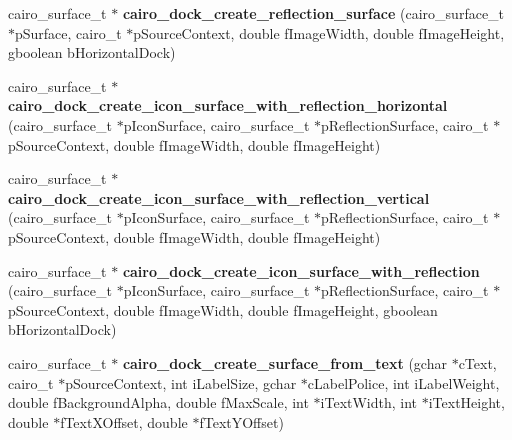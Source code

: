 \begin{CompactItemize}
\item 
cairo\_\-surface\_\-t $\ast$ {\bf cairo\_\-dock\_\-create\_\-reflection\_\-surface} (cairo\_\-surface\_\-t $\ast$p\-Surface, cairo\_\-t $\ast$p\-Source\-Context, double f\-Image\-Width, double f\-Image\-Height, gboolean b\-Horizontal\-Dock)
\item 
cairo\_\-surface\_\-t $\ast$ {\bf cairo\_\-dock\_\-create\_\-icon\_\-surface\_\-with\_\-reflection\_\-horizontal} (cairo\_\-surface\_\-t $\ast$p\-Icon\-Surface, cairo\_\-surface\_\-t $\ast$p\-Reflection\-Surface, cairo\_\-t $\ast$p\-Source\-Context, double f\-Image\-Width, double f\-Image\-Height)
\item 
cairo\_\-surface\_\-t $\ast$ {\bf cairo\_\-dock\_\-create\_\-icon\_\-surface\_\-with\_\-reflection\_\-vertical} (cairo\_\-surface\_\-t $\ast$p\-Icon\-Surface, cairo\_\-surface\_\-t $\ast$p\-Reflection\-Surface, cairo\_\-t $\ast$p\-Source\-Context, double f\-Image\-Width, double f\-Image\-Height)
\item 
cairo\_\-surface\_\-t $\ast$ {\bf cairo\_\-dock\_\-create\_\-icon\_\-surface\_\-with\_\-reflection} (cairo\_\-surface\_\-t $\ast$p\-Icon\-Surface, cairo\_\-surface\_\-t $\ast$p\-Reflection\-Surface, cairo\_\-t $\ast$p\-Source\-Context, double f\-Image\-Width, double f\-Image\-Height, gboolean b\-Horizontal\-Dock)
\item 
cairo\_\-surface\_\-t $\ast$ {\bf cairo\_\-dock\_\-create\_\-surface\_\-from\_\-text} (gchar $\ast$c\-Text, cairo\_\-t $\ast$p\-Source\-Context, int i\-Label\-Size, gchar $\ast$c\-Label\-Police, int i\-Label\-Weight, double f\-Background\-Alpha, double f\-Max\-Scale, int $\ast$i\-Text\-Width, int $\ast$i\-Text\-Height, double $\ast$f\-Text\-XOffset, double $\ast$f\-Text\-YOffset)
\end{CompactItemize}
